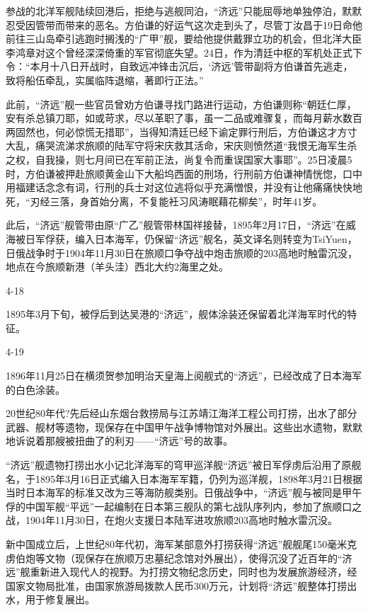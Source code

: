 \documentclass[12pt,UTF8]{ctexbook}
\begin{document}
参战的北洋军舰陆续回港后，拒绝与逃舰同泊，“济远”只能屈辱地单独停泊，默默忍受因管带而带来的恶名。方伯谦的好运气这次走到头了，尽管丁汝昌于19日命他前往三山岛牵引逃跑时搁浅的“广甲”舰，要给他提供戴罪立功的机会，但北洋大臣李鸿章对这个曾经深深倚重的军官彻底失望。24日，作为清廷中枢的军机处正式下令：“本月十八日开战时，自致远冲锋击沉后，‘济远’管带副将方伯谦首先逃走，致将船伍牵乱，实属临阵退缩，著即行正法。”

此前，“济远”舰一些官员曾劝方伯谦寻找门路进行运动，方伯谦则称“朝廷仁厚，安有杀总镇刀耶，如或苛求，尽以革职了事，虽一二品或难骤复，而每月薪水数百两固然也，何必惊慌无措耶”，当得知清廷已经下谕定罪行刑后，方伯谦这才方寸大乱，痛哭流涕求旅顺的陆军守将宋庆救其活命，宋庆则愤然道“我恨无海军生杀之权，自我操，则七月间已在军前正法，尚复令而重误国家大事耶”。25日凌晨5时，方伯谦被押赴旅顺黄金山下大船坞西面的刑场，行刑前方伯谦神情恍惚，口中用福建话念念有词，行刑的兵士对这位逃将似乎充满憎恨，并没有让他痛痛快快地死，“刃经三落，身首始分离，不复能衽习风涛眠藉花柳矣”，时年41岁。

此后，“济远”舰管带由原“广乙”舰管带林国祥接替，1895年2月17日，“济远”在威海被日军俘获，编入日本海军，仍保留“济远”舰名，英文译名则转变为TsiYuen，日俄战争时于1904年11月30日在旅顺口争夺战中炮击旅顺的203高地时触雷沉没，地点在今旅顺新港（羊头洼）西北大约2海里之处。

4-18

1895年3月下旬，被俘后到达吴港的“济远”，舰体涂装还保留着北洋海军时代的特征。

4-19

1896年11月25日在横须贺参加明治天皇海上阅舰式的“济远”，已经改成了日本海军的白色涂装。

20世纪80年代?先后经山东烟台救捞局与江苏靖江海洋工程公司打捞，出水了部分武器、舰材等遗物，现保存在中国甲午战争博物馆对外展出。这些出水遗物，默默地诉说着那艘被扭曲了的利刃——“济远”号的故事。

“济远”舰遗物打捞出水小记北洋海军的穹甲巡洋舰“济远”被日军俘虏后沿用了原舰名，于1895年3月16日正式编入日本海军军籍，仍列为巡洋舰，1898年3月21日根据当时日本海军的标准又改为三等海防舰类别。日俄战争中，“济远”舰与被同是甲午俘的中国军舰“平远”一起编制在日本第三舰队的第七战队序列内，参加了旅顺口之战，1904年11月30日，在炮火支援日本陆军进攻旅顺203高地时触水雷沉没。

新中国成立后，上世纪80年代初，海军某部意外打捞获得“济远”舰舰尾150毫米克虏伯炮等文物（现保存在旅顺万忠墓纪念馆对外展出），使得沉没了近百年的“济远”舰重新进入现代人的视野。为打捞文物纪念历史，同时也为发展旅游经济，经国家文物局批准，由国家旅游局拨款人民币300万元，计划将“济远”舰整体打捞出水，用于修复展出。
\end{document}
